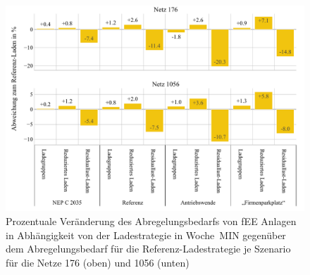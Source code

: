 \begin{figure}[H]
    \centering
    \includegraphics[width=\textwidth]{Bilder/176_1056_cur_fee_grid_week_A}
    \caption{Prozentuale Veränderung des Abregelungsbedarfs von fEE Anlagen in Abhängigkeit von der Ladestrategie in Woche~MIN gegenüber dem Abregelungsbedarf für die Referenz-Ladestrategie je Szenario für die Netze \num{176} (oben) und \num{1056} (unten)}\label{fig:176_1056_cur_fee_grid_week_A}
\end{figure}